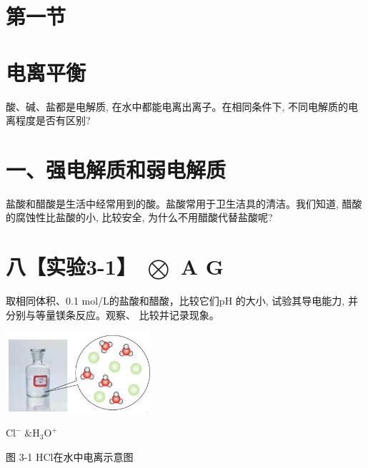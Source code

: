 \documentclass[10pt]{article}
\begin{document}
\section*{第一节}

\section*{电离平衡}

酸、碱、盐都是电解质, 在水中都能电离出离子。在相同条件下, 不同电解质的电离程度是否有区别?

\section*{一、强电解质和弱电解质}

盐酸和醋酸是生活中经常用到的酸。盐酸常用于卫生洁具的清洁。我们知道, 醋酸的腐蚀性比盐酸的小, 比较安全, 为什么不用醋酸代替盐酸呢?

\section*{八【实验3-1】 \(\bigotimes\) A G}

取相同体积、0.1 mol/L的盐酸和醋酸，比较它们pH 的大小, 试验其导电能力, 并分别与等量镁条反应。观察、 比较并记录现象。

\begin{center}
\includegraphics[max width=0.4\textwidth]{images/0190da9d-8bfd-732f-bc2c-0b21d0f13b91_63_316603.jpg}
\end{center}

\({\mathrm{{Cl}}}^{ - }\;\& {\mathrm{H}}_{3}{\mathrm{O}}^{ + }\)

图 3-1 HCl在水中电离示意图

\begin{center}
\end{center}
\end{document}
